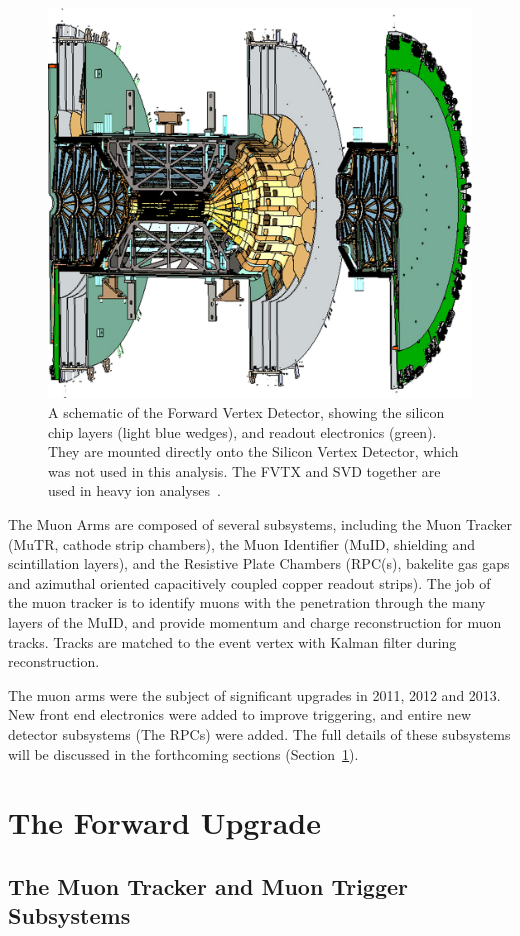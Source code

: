 \begin{figure}[ht]
  \centering
  \includegraphics[width=0.6\linewidth]{./figures/forward_vertex_detector}
  \caption{
    A schematic of the Forward Vertex Detector, showing the silicon chip layers
    (light blue wedges), and readout electronics (green). They are mounted
    directly onto the Silicon Vertex Detector, which was not used in this
    analysis. The FVTX and SVD together are used in heavy ion
    analyses~\cite{Aidala2014}.
  }
  \label{fig:forward_vertex_detector}
\end{figure}

The Muon Arms are composed of several subsystems, including the Muon Tracker
(MuTR, cathode strip chambers), the Muon Identifier (MuID, shielding and
scintillation layers), and the Resistive Plate Chambers (RPC(s), bakelite gas
gaps and azimuthal oriented capacitively coupled copper readout strips). The job
of the muon tracker is to identify muons with the penetration through the many
layers of the MuID, and provide momentum and charge reconstruction for muon
tracks. Tracks are matched to the event vertex with Kalman filter during
reconstruction.

The muon arms were the subject of significant upgrades in 2011, 2012 and 2013.
New front end electronics were added to improve triggering, and entire new
detector subsystems (The RPCs) were added. The full details of these subsystems
will be discussed in the forthcoming sections (Section~\ref{sec:forward_upgrade}).

\section{The Forward Upgrade} 
\label{sec:forward_upgrade}

\subsection{The Muon Tracker and Muon Trigger Subsystems}

